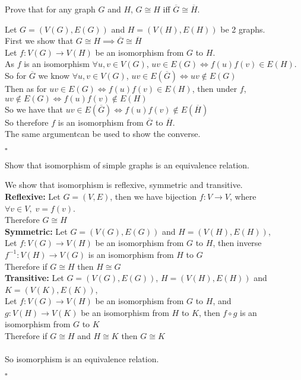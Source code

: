 \documentclass{exam}
\begin{document}
\begin{questions}
    \question Prove that for any graph $G$ and $H$, $G \cong H$ iff $\overline{G} \cong \overline{H}$.
    \begin{solution}
        Let $G = (V(G), E(G))$ and $H = (V(H), E(H))$ be 2 graphs.
        \\First we show that $G \cong H \implies \overline{G} \cong \overline{H}$
        \\Let $f:V(G) \rightarrow V(H)$ be an isomorphism from $G$ to $H$.
        \\As $f$ is an isomorphism $\forall u,v \in V(G)$, $uv\in E(G) \Leftrightarrow f(u)f(v)\in E(H)$.
        \\So for $\overline{G}$ we know $\forall u,v \in V(G)$, $uv\in E(\overline{G}) \Leftrightarrow uv \not\in E(G)$ 
        \\Then as for $uv\in E(G) \Leftrightarrow f(u)f(v)\in E(H)$, then under $f$, $uv\not\in E(G) \Leftrightarrow f(u)f(v)\not\in E(H)$
        \\So we have that $uv\in E(\overline{G}) \Leftrightarrow f(u)f(v)\not\in E(\overline{H})$
        \\So therefore $f$ is an isomorphism from $\overline{G}$ to $\overline{H}$.
        \\The same argumentcan be used to show the converse.
        \begin{flushright}
            $\square$
        \end{flushright}
    \end{solution}

    \question  Show that isomorphism of simple graphs is an equivalence relation.
    \begin{solution}
        We show that isomorphism is reflexive, symmetric and transitive.
        \\\textbf{Reflexive:} Let $G = (V,E)$, then we have bijection $f:V \rightarrow V$, where $\forall v \in V, \; v = f(v)$.
        \\Therefore $G \cong H$ 
        \\\textbf{Symmetric:}  Let $G = (V(G), E(G))$ and $H = (V(H), E(H))$,
        \\Let $f:V(G) \rightarrow V(H)$ be an isomorphism from $G$ to $H$, then inverse $f^{-1}:V(H) \rightarrow V(G)$ is an isomorphism from $H$ to $G$
        \\Therefore if $G \cong H$ then $H \cong G$
        \\\textbf{Transitive:} Let $G = (V(G), E(G))$, $H = (V(H), E(H))$ and $K = (V(K), E(K))$,
        \\Let $f:V(G) \rightarrow V(H)$ be an isomorphism from $G$ to $H$, and $g:V(H) \rightarrow V(K)$ be an isomorphism from $H$ to $K$, then $f \circ g$ is an isomorphism from $G$ to $K$
        \\Therefore if $G \cong H$ and $H \cong K$ then $G \cong K$
        \\\\So isomorphism is an equivalence relation.
        \begin{flushright}
            $\square$
        \end{flushright}
    \end{solution}


\end{questions}
\end{document}
